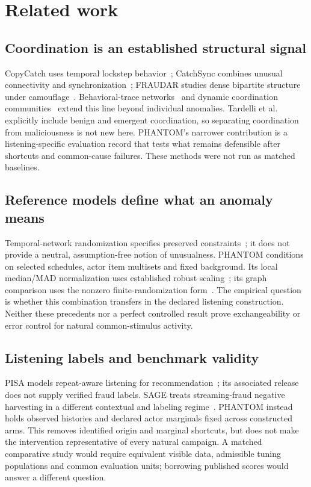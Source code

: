 \documentclass[sigconf,nonacm]{acmart}
\begin{document}
\section{Related work}
\subsection{Coordination is an established structural signal}
CopyCatch uses temporal lockstep behavior~\cite{copycatch}; CatchSync combines unusual connectivity and synchronization~\cite{catchsync}; FRAUDAR studies dense bipartite structure under camouflage~\cite{fraudar}. Behavioral-trace networks~\cite{pacheco} and dynamic coordination communities~\cite{tardelli} extend this line beyond individual anomalies. Tardelli et al. explicitly include benign and emergent coordination, so separating coordination from maliciousness is not new here. PHANTOM's narrower contribution is a listening-specific evaluation record that tests what remains defensible after shortcuts and common-cause failures. These methods were not run as matched baselines.

\subsection{Reference models define what an anomaly means}
Temporal-network randomization specifies preserved constraints~\cite{gauvin}; it does not provide a neutral, assumption-free notion of unusualness. PHANTOM conditions on selected schedules, actor item multisets and fixed background. Its local median/MAD normalization uses established robust scaling~\cite{rousseeuw}; its graph comparison uses the nonzero finite-randomization form~\cite{phipson}. The empirical question is whether this combination transfers in the declared listening construction. Neither these precedents nor a perfect controlled result prove exchangeability or error control for natural common-stimulus activity.

\subsection{Listening labels and benchmark validity}
PISA models repeat-aware listening for recommendation~\cite{pisa}; its associated release~\cite{deezerdata} does not supply verified fraud labels. SAGE treats streaming-fraud negative harvesting in a different contextual and labeling regime~\cite{sage}. PHANTOM instead holds observed histories and declared actor marginals fixed across constructed arms. This removes identified origin and marginal shortcuts, but does not make the intervention representative of every natural campaign. A matched comparative study would require equivalent visible data, admissible tuning populations and common evaluation units; borrowing published scores would answer a different question.
\end{document}
